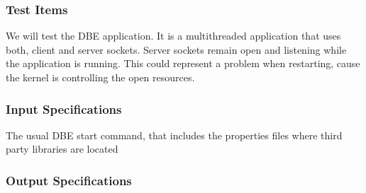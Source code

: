 





\subsubsection{Test Items}

We will test the DBE application. It is a multithreaded application that uses both, client and server sockets. Server sockets remain open and 
listening while the application is running. This could represent a problem when restarting, cause the kernel is controlling the open resources.

\subsubsection{Input Specifications}

The usual DBE start command, that includes the properties files where third party libraries are located

\subsubsection{Output Specifications}

